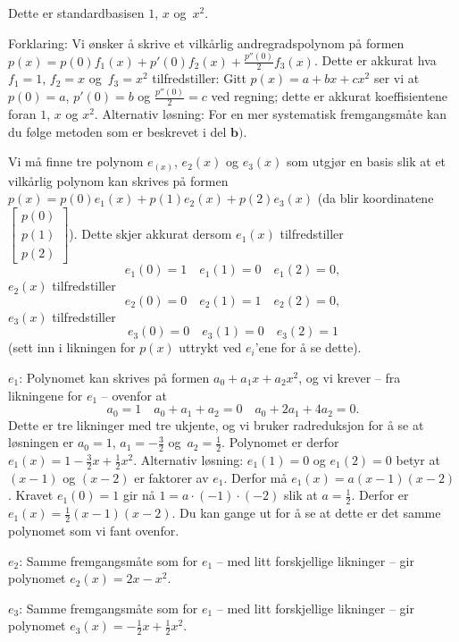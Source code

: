 \begin{losning}

\begin{punkt}
Dette er standardbasisen $1$, $x$ og~$x^2$.

\noindent
Forklaring: Vi ønsker å skrive et vilkårlig andregradspolynom på formen $p(x)=p(0)f_1(x)+p'(0)f_2(x)+\frac{p''(0)}{2}f_3(x)$. Dette er akkurat hva $f_1=1$, $f_2=x$ og~$f_3=x^2$ tilfredstiller: Gitt $p(x)=a+bx+cx^2$ ser vi at $p(0)=a$, $p'(0)=b$ og $\frac{p''(0)}{2}=c$ ved regning; dette er akkurat koeffisientene foran $1$, $x$ og $x^2$. Alternativ løsning: For en mer systematisk fremgangsmåte kan du følge metoden som er beskrevet i del $\textbf{b)}$.
\end{punkt}

\begin{punkt}
Vi må finne tre polynom $e_(x)$, $e_2(x)$ og $e_3(x)$ som utgjør en basis slik at et vilkårlig polynom kan skrives på formen $p(x)=p(0)e_1(x)+p(1)e_2(x)+p(2)e_3(x)$ (da blir koordinatene $\begin{bmatrix}
p(0)\\
p(1)\\
p(2)
\end{bmatrix}$). Dette skjer akkurat dersom $e_1(x)$ tilfredstiller $$e_1(0)=1\quad e_1(1)=0 \quad e_1(2)=0,$$ $e_2(x)$ tilfredstiller $$e_2(0)=0\quad e_2(1)=1 \quad e_2(2)=0,$$ $e_3(x)$ tilfredstiller $$e_3(0)=0\quad e_3(1)=0 \quad e_3(2)=1$$ (sett inn i likningen for $p(x)$ uttrykt ved $e_i$'ene for å se dette).

\noindent

$e_1$: Polynomet kan skrives på formen $a_0+a_1 x+a_2x^2$, og vi krever -- fra likningene for $e_1$ -- ovenfor at $$a_0=1\quad a_0+a_1+a_2=0 \quad a_0+2a_1+4a_2=0.$$ Dette er tre likninger med tre ukjente, og vi bruker radreduksjon for å se at løsningen er $a_0=1$, $a_1=-\frac{3}{2}$ og~$a_2=\frac{1}{2}$. Polynomet er derfor $e_1(x)=1-\frac{3}{2}x+\frac{1}{2}x^2$. Alternativ løsning: $e_1(1)=0$ og $e_1(2)=0$ betyr at $(x-1)$ og $(x-2)$ er faktorer av $e_1$. Derfor må $e_1(x)=a(x-1)(x-2)$. Kravet $e_1(0)=1$ gir nå $1=a\cdot(-1)\cdot (-2)$ slik at $a=\frac{1}{2}$. Derfor er $e_1(x)=\frac{1}{2}(x-1)(x-2)$. Du kan gange ut for å se at dette er det samme polynomet som vi fant ovenfor.

\noindent
$e_2$: Samme fremgangsmåte som for $e_1$ -- med litt forskjellige likninger -- gir polynomet $e_2(x)=2x-x^2$.

\noindent
$e_3$: Samme fremgangsmåte som for $e_1$ -- med litt forskjellige likninger -- gir polynomet $e_3(x)=-\frac{1}{2}x+\frac{1}{2}x^2$.


\end{punkt}
\end{losning}
